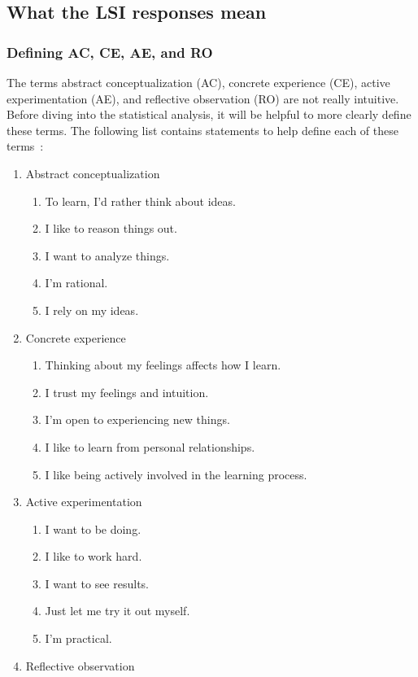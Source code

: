 \subsection{What the LSI responses mean}
\subsubsection{Defining AC, CE, AE, and RO}
The terms abstract conceptualization (AC), concrete experience (CE), active experimentation (AE), and reflective observation (RO) are not really intuitive. Before diving into the statistical analysis, it will be helpful to more clearly define these terms. The following list contains statements to help define each of these terms~\citep{kolb1993}:
\begin{enumerate}
  \item Abstract conceptualization
  \begin{enumerate}
    \item To learn, I'd rather think about ideas.
    \item I like to reason things out.
    \item I want to analyze things.
    \item I'm rational.
    \item I rely on my ideas.
  \end{enumerate}
  \item Concrete experience
  \begin{enumerate}
    \item Thinking about my feelings affects how I learn.
    \item I trust my feelings and intuition.
    \item I'm open to experiencing new things.
    \item I like to learn from personal relationships.
    \item I like being actively involved in the learning process.
  \end{enumerate}
  \item Active experimentation
  \begin{enumerate}
    \item I want to be doing.
    \item I like to work hard.
    \item I want to see results.
    \item Just let me try it out myself.
    \item I'm practical.
  \end{enumerate}
  \item Reflective observation

\end{enumerate}
